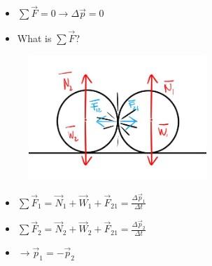 \documentclass[]{beamer}
\begin{document}
\begin{frame}
    \begin{itemize}
        \item $\sum \vec{ F}=0\rightarrow\Delta \vec p =0$
        \pause
        \item What is $\sum \vec F$?
    \end{itemize}
    \pause
    
    
    \begin{figure}[h!]  
        \includegraphics[width=0.6\textwidth]{images/2.jpg}
    
      \end{figure}
  
    
    
      \begin{itemize}
        \item $\sum \vec F_1=\vec N_1+\vec W_1+\vec F_{21}= \frac{\Delta \vec p_1}{\Delta t}$
 
        \item $\sum \vec F_2=\vec N_2+\vec W_2+\vec F_{21}= \frac{\Delta \vec p_2}{\Delta t}$
        \pause
        \item $\rightarrow \vec p_1=-\vec p_2$
    \end{itemize}
    
    
        \end{frame}
              
\end{document}
